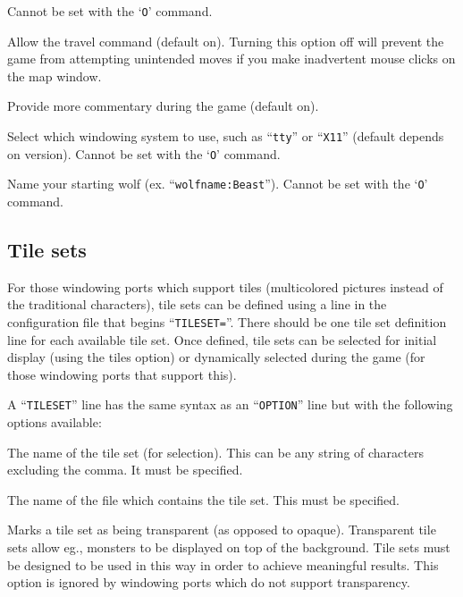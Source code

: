 Cannot be set with the `{\tt O}' command.

\item[\ib{travel}]
Allow the travel command (default on).  Turning this option off will
prevent the game from attempting unintended moves if you make inadvertent
mouse clicks on the map window.

\item[\ib{verbose}]
Provide more commentary during the game (default on).

\item[\ib{windowtype}]
Select which windowing system to use, such as ``{\tt tty}'' or ``{\tt X11}''
(default depends on version).
Cannot be set with the `{\tt O}' command.

\item[\ib{wolfname}]
Name your starting wolf (ex. ``{\tt wolfname:Beast}'').
Cannot be set with the `{\tt O}' command.
\elist
\nd %
\subsection*{Tile sets}


For those windowing ports which support tiles (multicolored pictures
instead of the traditional characters), tile sets can be defined using
a line in the configuration file that begins ``{\tt TILESET=}''. There should
be one tile set definition line for each available tile set. Once defined,
tile sets can be selected for initial display (using the tiles option) or
dynamically selected during the game (for those windowing ports that
support this).

A ``{\tt TILESET}'' line has the same syntax as an ``{\tt OPTION}'' line but with
the following options available:
\blist{}

\item[\ib{name}]
The name of the tile set (for selection). This can be any string of characters
excluding the comma. It must be specified.

\item[\ib{file}]
The name of the file which contains the tile set. This must be specified.

\item[\ib{transparent}]
Marks a tile set as being transparent (as opposed to opaque). Transparent
tile sets allow eg., monsters to be displayed on top of the background.
Tile sets must be designed to be used in this way in order to achieve
meaningful results. This option is ignored by windowing ports which do
not support transparency.

